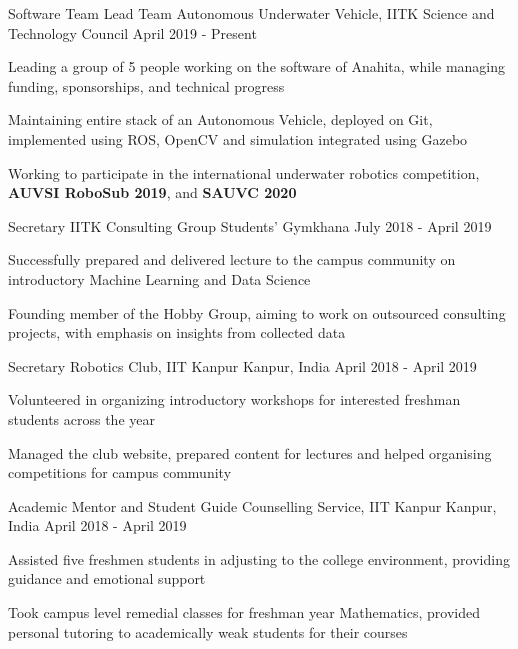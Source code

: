 \begin{cventries}

 \cventry
    {Software Team Lead}
    {Team Autonomous Underwater Vehicle, IITK}
    {Science and Technology Council}
    {April 2019 - Present}
    {
      \begin{cvitems}
        \item {Leading a group of 5 people working on the software of Anahita, while managing funding, sponsorships, and technical progress}
        \item {Maintaining entire stack of an Autonomous Vehicle, deployed on Git, implemented using ROS, OpenCV and simulation integrated using Gazebo}
        \item {Working to participate in the international underwater robotics competition, \textbf{AUVSI RoboSub 2019}, and \textbf{SAUVC 2020}}
      \end{cvitems}
    }

  \cventry
    {Secretary}
    {IITK Consulting Group}
    {Students' Gymkhana} 
    {July 2018 - April 2019}
    {
      \begin{cvitems}
        \item {Successfully prepared and delivered lecture to the campus community on introductory Machine Learning and Data Science}
        \item {Founding member of the Hobby Group, aiming to work on outsourced consulting projects, with emphasis on insights from collected data}
      \end{cvitems}
    }

  \cventry
    {Secretary}
    {Robotics Club, IIT Kanpur}
    {Kanpur, India} 
    {April 2018 - April 2019} 
    {
      \begin{cvitems}
        \item {Volunteered in organizing introductory workshops for interested freshman students across the year}
        \item{Managed the club website, prepared content for lectures and helped organising competitions for campus community}
        \end{cvitems}
    }

  \cventry
    {Academic Mentor and Student Guide}
    {Counselling Service, IIT Kanpur}
    {Kanpur, India}
    {April 2018 - April 2019}
    {
      \begin{cvitems} %
        \item {Assisted five freshmen students in adjusting to the college environment, providing guidance and emotional support}
        \item{Took campus level remedial classes for freshman year Mathematics, provided personal tutoring to academically weak students for their courses}
      \end{cvitems}
    }

\end{cventries}
